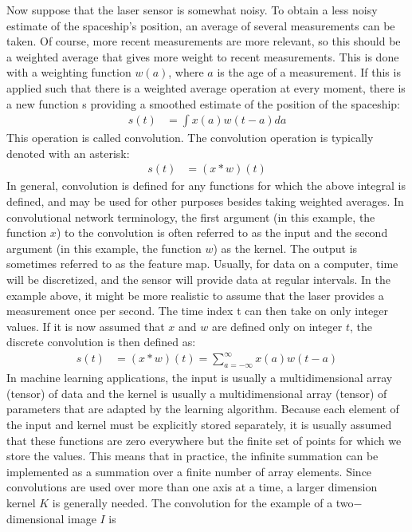 \documentclass[book.tex]{subfiles}
\begin{document}
Now suppose that the laser sensor is somewhat noisy. To obtain a less noisy estimate of the spaceship's position, an average of several measurements can be taken. Of course, more recent measurements are more relevant, so this should be a weighted average that gives more weight to recent measurements. This is done with a weighting function $w(a)$, where $a$ is the age of a measurement. If this is applied such that there is a weighted average operation at every moment, there is a new function s providing a smoothed estimate of the position of the spaceship: 
\begin{align}
s(t) &= \int x(a)w(t-a)da
\end{align} 
This operation is called convolution. The convolution operation is typically denoted with an asterisk:
\begin{align}
s(t) &= (x * w)(t)
\end{align}
\indent In general, convolution is defined for any functions for which the above integral is defined, and may be used for other purposes besides taking weighted averages. In convolutional network terminology, the first argument (in this example, the function $x$) to the convolution is often referred to as the input and the second argument (in this example, the function $w$) as the kernel. The output is sometimes referred to as the feature map. Usually, for data on a computer, time will be discretized, and the sensor will provide data at regular intervals. In the example above, it might be more realistic to assume that the laser provides a measurement once per second. The time index t can then take on only integer values. If it is now assumed that $x$ and $w$ are defined only on integer $t$, the discrete convolution is then defined as:
\begin{align}
s(t) &= (x*w)(t) = \sum^\infty_{a=-\infty} x(a)w(t-a)
\end{align}
In machine learning applications, the input is usually a multidimensional array (tensor) of data and the kernel is usually a multidimensional array (tensor) of parameters that are adapted by the learning algorithm. Because each element of the input and kernel must be explicitly stored separately, it is usually assumed that these functions are zero everywhere but the finite set of points for which we store the values. This means that in practice, the infinite summation can be implemented as a summation over a finite number of array elements. Since convolutions are used over more than one axis at a time, a larger dimension kernel $K$ is generally needed. The convolution for the example of a two$-$ dimensional image $I$ is
\end{document}

